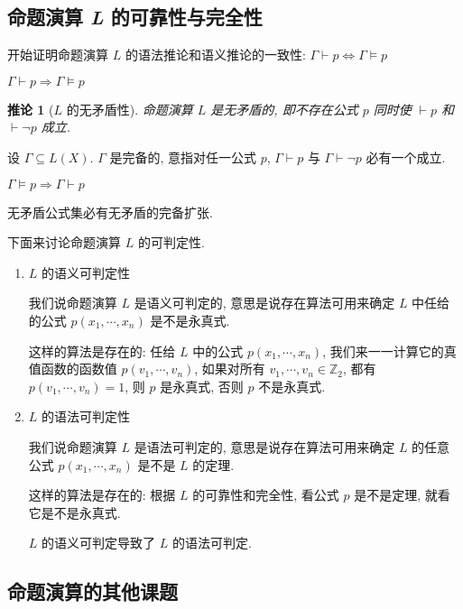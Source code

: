 \documentclass[
    color=black,
    device=normal,
    lang=cn
]{elegantnote}
\newtheorem{deduction}{推论}[section]
\begin{document}
\subsection{命题演算 \textit{L} 的可靠性与完全性}
开始证明命题演算 $L$ 的语法推论和语义推论的一致性: $\Gamma\vdash p\Leftrightarrow\Gamma\vDash p$
\begin{theorem}[$L$ 的可靠性]
    $\Gamma\vdash p\Rightarrow\Gamma\vDash p$
\end{theorem}
\begin{deduction}[$L$ 的无矛盾性]
    命题演算 $L$ 是无矛盾的, 即不存在公式 $p$ 同时使 $\vdash p$ 和 $\vdash \lnot p$ 成立.
\end{deduction}
\begin{definition}[公式集的完备性]
    设 $\Gamma\subseteq L(X)$. $\Gamma$ 是完备的, 意指对任一公式 $p$, $\Gamma\vdash p$ 与 $\Gamma\vdash\lnot p$ 必有一个成立.
\end{definition}
\begin{theorem}[$L$ 的完全性]
    $\Gamma\vDash p\Rightarrow \Gamma\vdash p$
\end{theorem}
\begin{proposition}
    无矛盾公式集必有无矛盾的完备扩张.
\end{proposition}
下面来讨论命题演算 $L$ 的可判定性.

\begin{enumerate}[label = $\arabic*^\circ$, listparindent = 2em, topsep = -1em]
    \item $L$ 的语义可判定性

          我们说命题演算 $L$ 是语义可判定的, 意思是说存在算法可用来确定 $L$ 中任给的公式 $p(x_1,\cdots,x_n)$ 是不是永真式.

          这样的算法是存在的: 任给 $L$ 中的公式 $p(x_1,\cdots,x_n)$, 我们来一一计算它的真值函数的函数值 $p(v_1, \cdots, v_n)$, 如果对所有 $v_1, \cdots,v_n\in\mathbb{Z}_2$, 都有 $p(v_1, \cdots, v_n) = 1$, 则 $p$ 是永真式, 否则 $p$ 不是永真式.
    \item $L$ 的语法可判定性

          我们说命题演算 $L$ 是语法可判定的, 意思是说存在算法可用来确定 $L$ 的任意公式 $p(x_1,\cdots,x_n)$ 是不是 $L$ 的定理.

          这样的算法是存在的: 根据 $L$ 的可靠性和完全性, 看公式 $p$ 是不是定理, 就看它是不是永真式.

          $L$ 的语义可判定导致了 $L$ 的语法可判定.
\end{enumerate}
\subsection{命题演算的其他课题}
\end{document}
